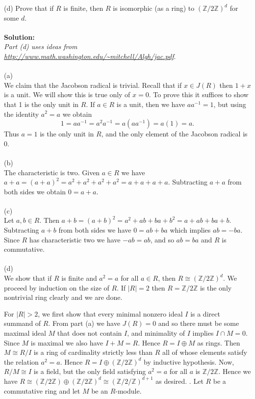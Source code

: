 \documentclass[11pt]{article}
\newcommand{\Z}{\mathbb{Z}}
\begin{document}
(d) Prove that if $R$ is finite, then $R$ is isomorphic (as a ring) to $(\Z/2\Z)^d$ for some $d$.\\\\
\textbf{Solution:}\\
\emph{Part (d) uses ideas from \url{http://www.math.washington.edu/~mitchell/Algh/jac.pdf}}.\\\\
(a)\\
We claim that the Jacobson radical is trivial. Recall that if $x\in J(R)$ then $1+x$ is a unit. We will show this is true only of $x=0$. To prove this it suffices to show that 1 is the only unit in $R$. If $a\in R$ is a unit, then we have $aa^{-1} = 1$, but using the identity $a^2=a$ we obtain \[
1 = aa^{-1} = a^2a^{-1} = a(aa^{-1}) = a(1) = a.
\]
Thus $a=1$ is the only unit in $R$, and the only element of the Jacobson radical is 0.\\\\
(b)\\
The characteristic is two. Given $a\in R$ we have $a+a = (a+a)^2 = a^2+a^2+a^2+a^2 = a+a+a+a$. Subtracting $a+a$ from both sides we obtain $0= a+a$. \\\\
(c)\\
Let $a,b\in R$. Then $a+b = (a+b)^2 = a^2 + ab + ba + b^2 = a+ ab + ba + b$. Subtracting $a+b$ from both sides we have $0 = ab+ba$ which implies $ab = -ba$. Since $R$ has characteristic two we have $-ab = ab$, and so $ab = ba$ and $R$ is commutative.\\\\
(d)\\
We show that if $R$ is finite and $a^2=a$ for all $a\in R$, then $R\cong (\Z/2\Z)^d$. We proceed by induction on the size of $R$. If $|R| = 2$ then $R = \Z/2\Z$ is the only nontrivial ring clearly and we are done. 

For $|R|>2$,  we first show that every minimal nonzero ideal $I$ is a direct summand of $R$. From part (a) we have  $J(R) = 0$ and so there must be some maximal ideal $M$ that does not contain $I$, and minimality of $I$ implies $I\cap M = 0$. Since $M$ is maximal we also have $I+M = R$. Hence $R = I\oplus M$ as rings. Then $M\cong R/I$ is a ring of cardinality strictly less than $R$ all of whose elements satisfy the relation $a^2=a$. Hence $R = I\oplus (\Z/2\Z)^d$ by inductive hypothesis. Now, $R/M\cong I$ is a field, but the only field satisfying $a^2=a$ for all $a$ is $\Z/2\Z$. Hence we have $R \cong (\Z/2\Z) \oplus (\Z/2\Z)^d \cong (\Z/2/\Z)^{d+1}$ as desired.
. Let $R$ be a commutative ring and let $M$ be an $R$-module.
\end{document}
